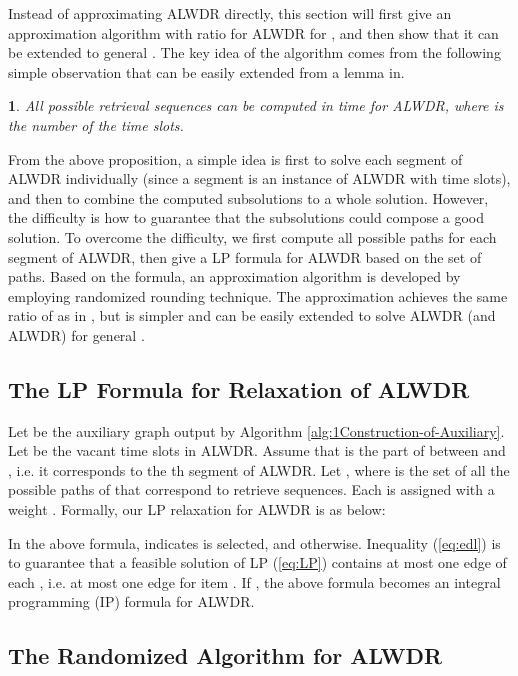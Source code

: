 \documentclass[11pt,english,onecolumn,draftcls]{IEEEtran}
\theoremstyle{plain}
\theoremstyle{plain}
\newtheorem{prop}[thm]{\protect\propositionname}
\theoremstyle{plain}
\theoremstyle{plain}
\providecommand{\propositionname}{Proposition}
\begin{document}
Instead of approximating ALWDR directly, this section will
first give an approximation algorithm with ratio 
for ALWDR for , and then show that it
can be extended to general . The key idea of the algorithm
comes from the following simple observation that can be easily extended
from a lemma in\cite{lu2014data}.
\begin{prop}
All possible  retrieval sequences can be computed in 
time for ALWDR, where  is the number of the time slots.
\end{prop}
From the above proposition, a simple idea is first to solve each segment
of ALWDR individually (since a segment is an instance
of ALWDR with  time slots), and then to combine
the computed subsolutions to a whole solution. However, the difficulty
is how to guarantee that the subsolutions could compose a good solution.
To overcome the difficulty, we first compute all possible paths for
each segment of ALWDR, then give a LP formula for
ALWDR based on the set of paths. Based on the formula,
an approximation algorithm is developed by employing randomized rounding
technique. The approximation achieves the same ratio of  as
in \cite{lu2014data}, but is simpler and can be easily extended to
solve ALWDR (and ALWDR) for general .


\subsection{The LP Formula for Relaxation of ALWDR}

Let  be the auxiliary graph output by Algorithm \ref{alg:1Construction-of-Auxiliary}.
Let  be the vacant
time slots in ALWDR. Assume that  is the
part of  between  and , i.e. it corresponds
to the th segment of ALWDR. Let ,
where 
is the set of all the possible paths of  that correspond to
retrieve sequences. Each  is assigned with a weight .
Formally, our LP relaxation for ALWDR is as below:




In the above formula,  indicates  is selected,
and  otherwise. Inequality (\ref{eq:edl}) is to guarantee
that a feasible solution of LP (\ref{eq:LP}) contains at most one
edge of each , i.e. at most one edge for item .
If  , the above formula becomes an integral
programming (IP) formula for ALWDR.


\subsection{The Randomized Algorithm for ALWDR }
\end{document}
